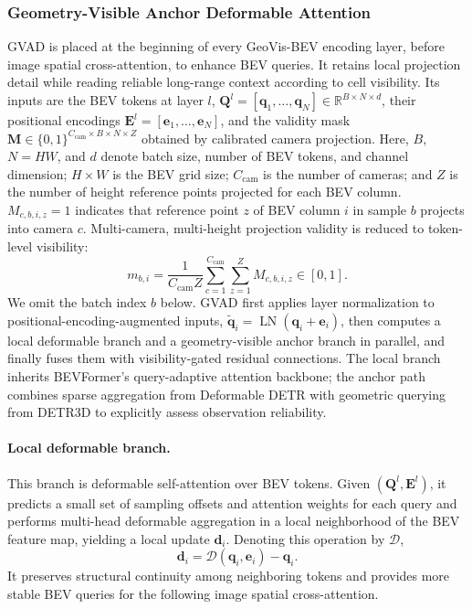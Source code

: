 \documentclass[a4paper,fleqn]{cas-sc}
\newcommand{\R}{\mathbb{R}}
\begin{document}
\subsubsection{Geometry-Visible Anchor Deformable Attention}\label{sec:gvad}
GVAD is placed at the beginning of every GeoVis-BEV encoding layer, before image spatial cross-attention, to enhance BEV queries. It retains local projection detail while reading reliable long-range context according to cell visibility. Its inputs are the BEV tokens at layer $l$, $\bm{Q}^{l}=[\bm{q}_1,\ldots,\bm{q}_{N}]\in\R^{B\times N\times d}$, their positional encodings $\bm{E}^{l}=[\bm{e}_1,\ldots,\bm{e}_{N}]$, and the validity mask $\bm{M}\in\{0,1\}^{C_{\mathrm{cam}}\times B\times N\times Z}$ obtained by calibrated camera projection. Here, $B$, $N=HW$, and $d$ denote batch size, number of BEV tokens, and channel dimension; $H\times W$ is the BEV grid size; $C_{\mathrm{cam}}$ is the number of cameras; and $Z$ is the number of height reference points projected for each BEV column. $M_{c,b,i,z}=1$ indicates that reference point $z$ of BEV column $i$ in sample $b$ projects into camera $c$. Multi-camera, multi-height projection validity is reduced to token-level visibility:
\begin{equation}
m_{b,i}=\frac{1}{C_{\mathrm{cam}}Z}\sum_{c=1}^{C_{\mathrm{cam}}}\sum_{z=1}^{Z}M_{c,b,i,z}\in[0,1].
\end{equation}
We omit the batch index $b$ below. GVAD first applies layer normalization to positional-encoding-augmented inputs, $\tilde{\bm{q}}_i=\operatorname{LN}(\bm{q}_i+\bm{e}_i)$, then computes a local deformable branch and a geometry-visible anchor branch in parallel, and finally fuses them with visibility-gated residual connections. The local branch inherits BEVFormer's query-adaptive attention backbone\citep{li2022bevformer}; the anchor path combines sparse aggregation from Deformable DETR\citep{zhu2021deformable} with geometric querying from DETR3D\citep{wang2022detr3d} to explicitly assess observation reliability.

\paragraph{Local deformable branch.} This branch is deformable self-attention over BEV tokens. Given $(\bm{Q}^{l},\bm{E}^{l})$, it predicts a small set of sampling offsets and attention weights for each query and performs multi-head deformable aggregation in a local neighborhood of the BEV feature map, yielding a local update $\bm{d}_i$. Denoting this operation by $\mathcal{D}$,
\begin{equation}
\bm{d}_i=\mathcal{D}(\bm{q}_i,\bm{e}_i)-\bm{q}_i.
\end{equation}
It preserves structural continuity among neighboring tokens and provides more stable BEV queries for the following image spatial cross-attention.
\end{document}
